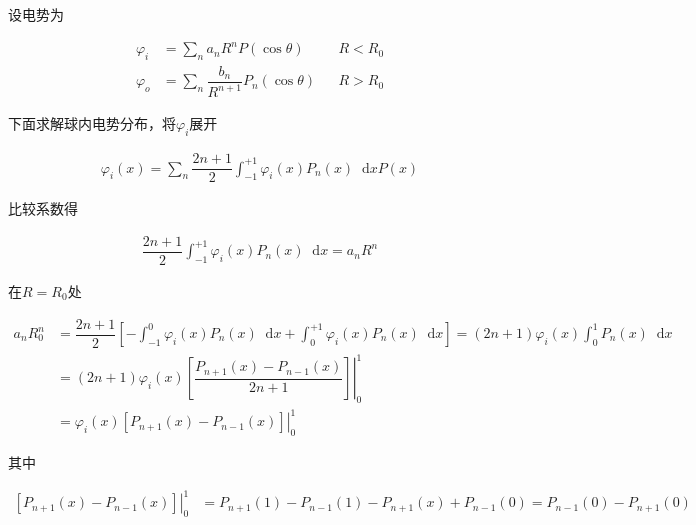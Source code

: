 \documentclass{article}
\newcommand*{\md}{\mathop{}\!\mathrm{d}}
\begin{document}
设电势为

\begin{equation*}
  \begin{aligned}
    \varphi_i &= \sum_n a_n R^n P \left( \cos \theta \right) && R<R_0 \\
    \varphi_o &= \sum_n \dfrac{b_n}{R^{n+1}} P_n \left( \cos \theta \right) && R>R_0 
  \end{aligned}
\end{equation*}

下面求解球内电势分布，将$\varphi_i$展开

\begin{equation*}
  \begin{aligned}
    \varphi_i \left( x \right) = \sum_n \dfrac{2n+1}{2} \int_{-1}^{+1} \varphi_i \left( x \right) P_n \left( x \right) \md x P \left( x \right) 
  \end{aligned}
\end{equation*}

比较系数得

\begin{equation*}
  \begin{aligned}
    \dfrac{2n+1}{2} \int_{-1}^{+1} \varphi_i \left( x \right) P_n \left( x \right) \md x
    = a_n R^n
  \end{aligned}
\end{equation*}

在$R=R_0$处

\begin{equation*}
  \begin{aligned}
    a_n R_0^n &=
    \dfrac{2n+1}{2} \left[ - \int_{-1}^{0} \varphi_i \left( x \right) P_n \left( x \right) \md x + \int_{0}^{+1} \varphi_i \left( x \right) P_n \left( x \right) \md x \right]
    = \left( 2n+1 \right) \varphi_i \left( x \right) \int_0^1 P_n \left( x \right) \md x \\
    &= \left( 2n+1 \right) \varphi_i \left( x \right) \left. \left[ \dfrac{P_{n+1} \left( x \right) - P_{n-1} \left( x \right)}{2n+1} \right] \right|_0^1 \\
    &= \varphi_i \left( x \right) \left. \left[  P_{n+1} \left( x \right) - P_{n-1} \left( x \right) \right] \right|_0^1
  \end{aligned}
\end{equation*}

其中

\begin{equation*}
  \begin{aligned}
    \left. \left[  P_{n+1} \left( x \right) - P_{n-1} \left( x \right) \right] \right|_0^1
    &= P_{n+1} \left( 1 \right) - P_{n-1} \left( 1 \right) - P_{n+1} \left( x \right) + P_{n-1} \left( 0 \right) = P_{n-1} \left( 0 \right) - P_{n+1} \left( 0 \right) 
  \end{aligned}
\end{equation*}
\end{document}
